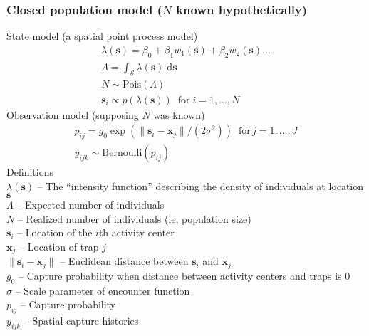 \documentclass[color=usenames,dvipsnames]{beamer}\usepackage[]{graphicx}\usepackage[]{color}
\newcommand{\bxj}{{\bm x}_j}
\newcommand{\bs}{{\bm s}}
\newcommand{\bsi}{{\bm s}_i}
\newcommand{\dsixj}{\|\bsi - \bxj\|}
\begin{document}
\begin{frame}
  \frametitle{\large Closed population model ($N$ known hypothetically) }
  \footnotesize
  State model (a spatial point process model) %
  \begin{gather*}
    \lambda(\bs) = \beta_0 + \beta_1 w_1(\bs) + \beta_2 w_2(\bs) \dots \\
    \Lambda = \int_{\mathcal{S}} \lambda(\bs) \; \mathrm{d}\bs \\
    N \sim \mathrm{Pois}(\Lambda) \\
    \bsi \propto p(\lambda(\bs)) \;\; \mathrm{for}\; i=1,\dots,N 
  \end{gather*}
  \pause
  Observation model (supposing $N$ was known)
  \begin{gather*}
    p_{ij} = g_0\exp(\|\bsi - \bxj\|/(2\sigma^2))  \;\; \mathrm{for}\, j=1,\dots,J  \\
    y_{ijk} \sim \mathrm{Bernoulli}(p_{ij})
  \end{gather*}
  \pause
  \scriptsize
  Definitions \\
  \hangindent=0.9cm $\lambda(\bs)$ -- The ``intensity function'' %
  describing the density of individuals at location $\bs$ \\ 
  $\Lambda$ -- Expected number of individuals \\
  $N$ -- Realized number of individuals (ie, population size) \\
  $\bsi$ -- Location of the $i$th activity center \\
  $\bxj$ -- Location of trap $j$ \\
  $\dsixj$ -- Euclidean distance between $\bsi$ and $\bxj$ \\
  $g_0$ -- Capture probability when distance between activity centers
  and traps is 0 \\
  $\sigma$ -- Scale parameter of encounter function \\
  $p_{ij}$ -- Capture probability \\
  $y_{ijk}$ -- Spatial capture histories \\
\end{frame}
\end{document}

